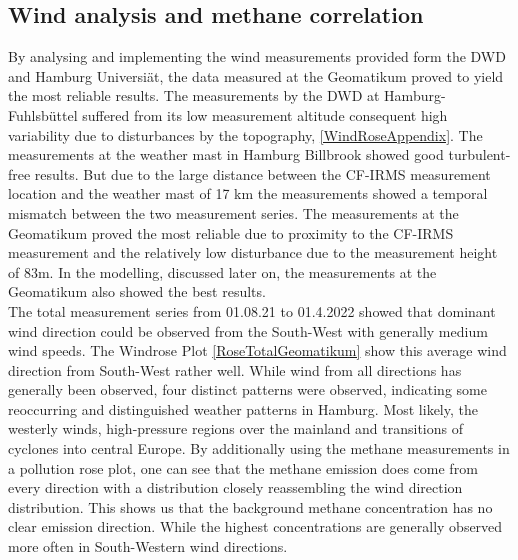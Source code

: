 \subsection{Wind analysis and methane correlation}
By analysing and implementing the wind measurements provided form the DWD and Hamburg Universiät, the data measured at the Geomatikum proved to yield the most reliable results. The measurements by the DWD at Hamburg-Fuhlsbüttel suffered from its low measurement altitude consequent high variability due to disturbances by the topography, \cref{WindRoseAppendix}. The measurements at the weather mast in Hamburg Billbrook showed good turbulent-free results. But due to the large distance between the CF-IRMS measurement location and the weather mast of 17 km the measurements showed a temporal mismatch between the two measurement series. The measurements at the Geomatikum proved the most reliable due to proximity to the CF-IRMS measurement and the relatively low disturbance due to the measurement height of 83m. In the modelling, discussed later on, the measurements at the Geomatikum also showed the best results.\\
The total measurement series from 01.08.21 to 01.4.2022 showed that dominant wind direction could be observed from the South-West with generally medium wind speeds. The Windrose Plot \cref{RoseTotalGeomatikum} show this average wind direction from South-West rather well. While wind from all directions has generally been observed, four distinct patterns were observed, indicating some reoccurring and distinguished weather patterns in Hamburg. Most likely, the westerly winds, high-pressure regions over the mainland and transitions of cyclones into central Europe. By additionally using the methane measurements in a pollution rose plot, one can see that the methane emission does come from every direction with a distribution closely reassembling the wind direction distribution. This shows us that the background methane concentration has no clear emission direction. While the highest concentrations are generally observed more often in South-Western wind directions.
